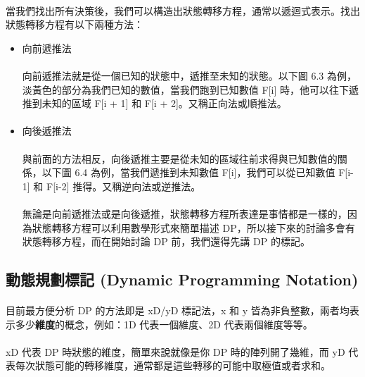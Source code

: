 \documentclass[12pt,a4paper,oneside]{report}
\begin{document}
\begin{CJK}{UTF8}{bkai}
\begin{itemize}
\paragraph{}當我們找出所有決策後，我們可以構造出狀態轉移方程，通常以遞迴式表示。找出狀態轉移方程有以下兩種方法：
  \begin{itemize}
  \item 向前遞推法
  \paragraph{}向前遞推法就是從一個已知的狀態中，遞推至未知的狀態。以下圖 6.3 為例，淡黃色的部分為我們已知的數值，當我們跑到已知數值 F[i] 時，他可以往下遞推到未知的區域 F[i + 1] 和 F[i + 2]。又稱正向法或順推法。
  \paragraph{}
  \item 向後遞推法
  \paragraph{}與前面的方法相反，向後遞推主要是從未知的區域往前求得與已知數值的關係，以下圖 6.4 為例，當我們遞推到未知數值 F[i]，我們可以從已知數值 F[i-1] 和 F[i-2] 推得。又稱逆向法或逆推法。
  \paragraph{}無論是向前遞推法或是向後遞推，狀態轉移方程所表達是事情都是一樣的，因為狀態轉移方程可以利用數學形式來簡單描述 DP，所以接下來的討論多會有狀態轉移方程，而在開始討論 DP 前，我們還得先講 DP 的標記。
  \end{itemize}
\end{itemize}

\subsection{動態規劃標記 (Dynamic Programming Notation)}

\paragraph{}目前最方便分析 DP 的方法即是 xD/yD 標記法，x 和 y 皆為非負整數，兩者均表示多少\textbf{維度}的概念，例如：1D 代表一個維度、2D 代表兩個維度等等。
\paragraph{}xD 代表 DP 時狀態的維度，簡單來說就像是你 DP 時的陣列開了幾維，而 yD 代表每次狀態可能的轉移維度，通常都是這些轉移的可能中取極值或者求和。

\end{CJK}
\end{document}
